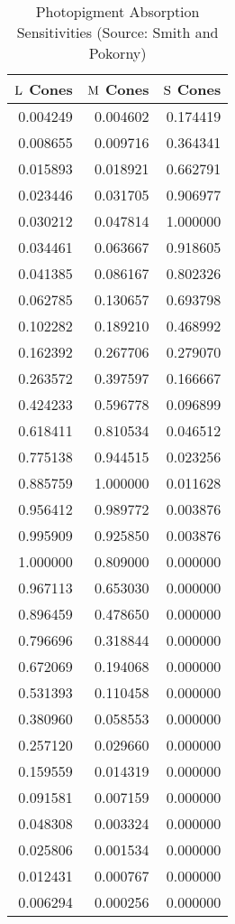 \begin{table}
 \caption{Photopigment Absorption Sensitivities (Source: Smith and Pokorny)}
 \label{t3:ncones}
 \begin{center}
  \begin{tabular}{||r|r|r||} \hline 
$\mbox{L}$ Cones & $\mbox{M}$ Cones & $\mbox{S}$ Cones \\ \hline
0.004249 & 0.004602 & 0.174419 \\ \hline
0.008655 & 0.009716 & 0.364341 \\ \hline
0.015893 & 0.018921 & 0.662791 \\ \hline
0.023446 & 0.031705 & 0.906977 \\ \hline
0.030212 & 0.047814 & 1.000000 \\ \hline
0.034461 & 0.063667 & 0.918605 \\ \hline
0.041385 & 0.086167 & 0.802326 \\ \hline
0.062785 & 0.130657 & 0.693798 \\ \hline
0.102282 & 0.189210 & 0.468992 \\ \hline
0.162392 & 0.267706 & 0.279070 \\ \hline
0.263572 & 0.397597 & 0.166667 \\ \hline
0.424233 & 0.596778 & 0.096899 \\ \hline
0.618411 & 0.810534 & 0.046512 \\ \hline
0.775138 & 0.944515 & 0.023256 \\ \hline
0.885759 & 1.000000 & 0.011628 \\ \hline
0.956412 & 0.989772 & 0.003876 \\ \hline
0.995909 & 0.925850 & 0.003876 \\ \hline
1.000000 & 0.809000 & 0.000000 \\ \hline
0.967113 & 0.653030 & 0.000000 \\ \hline
0.896459 & 0.478650 & 0.000000 \\ \hline
0.796696 & 0.318844 & 0.000000 \\ \hline
0.672069 & 0.194068 & 0.000000 \\ \hline
0.531393 & 0.110458 & 0.000000 \\ \hline
0.380960 & 0.058553 & 0.000000 \\ \hline
0.257120 & 0.029660 & 0.000000 \\ \hline
0.159559 & 0.014319 & 0.000000 \\ \hline
0.091581 & 0.007159 & 0.000000 \\ \hline
0.048308 & 0.003324 & 0.000000 \\ \hline
0.025806 & 0.001534 & 0.000000 \\ \hline
0.012431 & 0.000767 & 0.000000 \\ \hline
0.006294 & 0.000256 & 0.000000 \\ \hline
  \end{tabular}
 \end{center}
\end{table}
